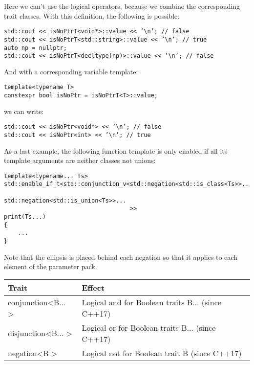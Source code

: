 Here we can’t use the logical operators, because we combine the corresponding trait classes. With this definition, the following is possible:

\begin{lstlisting}[style=styleCXX]
std::cout << isNoPtrT<void*>::value << ’\n’; // false
std::cout << isNoPtrT<std::string>::value << ’\n’; // true
auto np = nullptr;
std::cout << isNoPtrT<decltype(np)>::value << ’\n’; // false
\end{lstlisting}

And with a corresponding variable template:

\begin{lstlisting}[style=styleCXX]
template<typename T>
constexpr bool isNoPtr = isNoPtrT<T>::value;
\end{lstlisting}

we can write:

\begin{lstlisting}[style=styleCXX]
std::cout << isNoPtr<void*> << ’\n’; // false
std::cout << isNoPtr<int> << ’\n’; // true
\end{lstlisting}

As a last example, the following function template is only enabled if all its template arguments are neither classes not unions:

\begin{lstlisting}[style=styleCXX]
template<typename... Ts>
std::enable_if_t<std::conjunction_v<std::negation<std::is_class<Ts>>...,
									std::negation<std::is_union<Ts>>...
									>>
print(Ts...)
{
	...
}
\end{lstlisting}

Note that the ellipsis is placed behind each negation so that it applies to each element of the parameter pack.

\begin{table}[H]
	\begin{center}
	\begin{tabular}{l|l}
		\hline
		\textbf{Trait}                            & \textbf{Effect}                                   \\ \hline
		conjunction\textless{}B... \textgreater{} & Logical and for Boolean traits B... (since C++17) \\ \hline
		disjunction\textless{}B... \textgreater{} & Logical or for Boolean traits B... (since C++17)  \\ \hline
		negation\textless{}B \textgreater{}       & Logical not for Boolean trait B (since C++17)     \\ \hline
	\end{tabular}
	\end{center}
\end{table}

